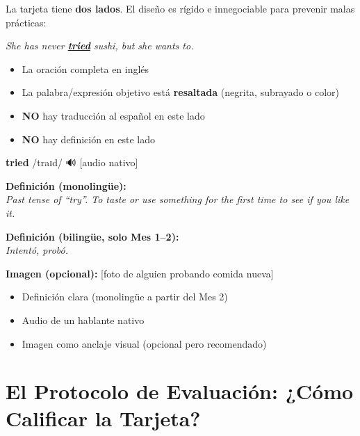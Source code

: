 \documentclass[12pt,a4paper]{article}
\begin{document}
\begin{cajaprincipio}
La tarjeta tiene \textbf{dos lados}. El diseño es rígido e innegociable para prevenir malas prácticas:

\medskip
\begin{cajatarjeta}
\begin{center}
\large
\textit{She has never \underline{\textbf{tried}} sushi, but she wants to.}
\end{center}
\begin{itemize}[nosep, leftmargin=0.8cm]
  \item La oración completa en inglés
  \item La palabra/expresión objetivo está \textbf{resaltada} (negrita, subrayado o color)
  \item \textbf{NO} hay traducción al español en este lado
  \item \textbf{NO} hay definición en este lado
\end{itemize}
\end{cajatarjeta}

\medskip
\begin{cajatarjeta}
\textbf{tried} /traɪd/ \quad 🔊 {\small [audio nativo]}

\medskip
\textbf{Definición (monolingüe):}\\
\textit{Past tense of ``try''. To taste or use something for the first time to see if you like it.}

\medskip
\textbf{Definición (bilingüe, solo Mes 1--2):}\\
\textit{Intentó, probó.}

\medskip
\textbf{Imagen (opcional):} [foto de alguien probando comida nueva]

\begin{itemize}[nosep, leftmargin=0.8cm]
  \item Definición clara (monolingüe a partir del Mes 2)
  \item Audio de un hablante nativo
  \item Imagen como anclaje visual (opcional pero recomendado)
\end{itemize}
\end{cajatarjeta}
\end{cajaprincipio}

\section{El Protocolo de Evaluación: ¿Cómo Calificar la Tarjeta?}
\end{document}

